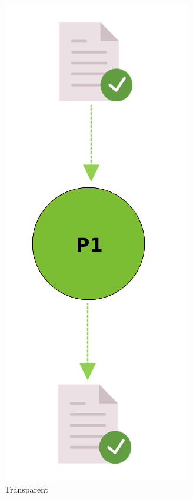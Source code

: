 \documentclass[a4paper,num-refs]{oup-contemporary}
\begin{document}
\begin{figure}%
\centering
    \begin{subfigure}{0.3\linewidth}
      \centering
        \includegraphics[scale=0.36]{images/green.png}
        \caption{Transparent}
        \label{fig:green}
    \end{subfigure}
    \hfill
    \begin{subfigure}{0.35\linewidth}
      \centering

\end{subfigure}
\end{figure}
\end{document}

